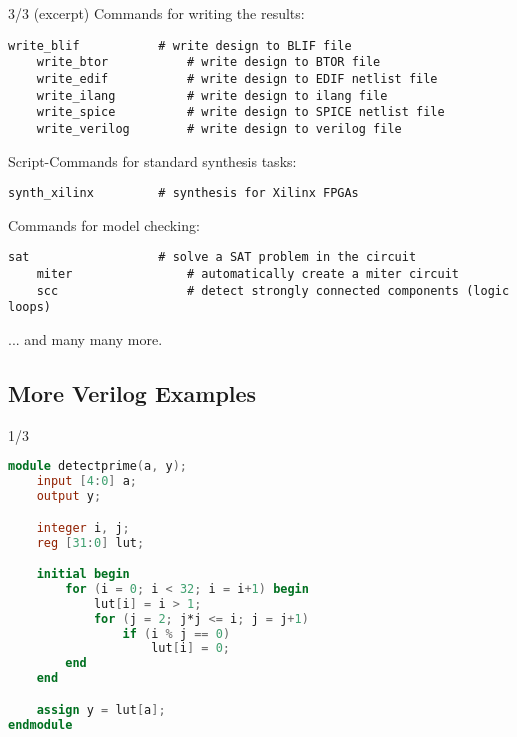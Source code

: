 \begin{frame}[fragile]{\subsecname{} 3/3 \hspace{0pt plus 1 filll} (excerpt)}
Commands for writing the results:
\begin{lstlisting}[xleftmargin=1cm, basicstyle=\ttfamily\fontsize{8pt}{10pt}\selectfont, language=ys]
    write_blif           # write design to BLIF file
    write_btor           # write design to BTOR file
    write_edif           # write design to EDIF netlist file
    write_ilang          # write design to ilang file
    write_spice          # write design to SPICE netlist file
    write_verilog        # write design to verilog file
\end{lstlisting}

\bigskip
Script-Commands for standard synthesis tasks:
\begin{lstlisting}[xleftmargin=1cm, basicstyle=\ttfamily\fontsize{8pt}{10pt}\selectfont, language=ys]
    synth_xilinx         # synthesis for Xilinx FPGAs
\end{lstlisting}

\bigskip
Commands for model checking:
\begin{lstlisting}[xleftmargin=1cm, basicstyle=\ttfamily\fontsize{8pt}{10pt}\selectfont, language=ys]
    sat                  # solve a SAT problem in the circuit
    miter                # automatically create a miter circuit
    scc                  # detect strongly connected components (logic loops)
\end{lstlisting}

\bigskip
... and many many more.
\end{frame}


\subsection{More Verilog Examples}

\begin{frame}[fragile]{\subsecname{} 1/3}
\begin{lstlisting}[xleftmargin=1cm, basicstyle=\ttfamily\fontsize{8pt}{10pt}\selectfont, language=Verilog]
module detectprime(a, y);
    input [4:0] a;
    output y;

    integer i, j;
    reg [31:0] lut;

    initial begin
        for (i = 0; i < 32; i = i+1) begin
            lut[i] = i > 1;
            for (j = 2; j*j <= i; j = j+1)
                if (i % j == 0)
                    lut[i] = 0;
        end
    end

    assign y = lut[a];
endmodule
\end{lstlisting}
\end{frame}

